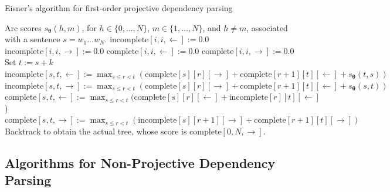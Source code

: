 \begin{algorithm}[h!]
   \caption{Eisner's algorithm for first-order projective dependency parsing\label{alg:eisner}}
\begin{algorithmic}[1]
    Arc scores $s_{\boldsymbol{\theta}}(h,m)$, for $h \in \{0,\ldots,N\}$, 
   $m \in \{1,\ldots,N\}$, and $h \ne m$, associated with a sentence $s=w_1\ldots w_N$.
   \STATE {}
	\STATE {}
	\STATE $\mathrm{incomplete}[i,i,\leftarrow] := 0.0$
	\STATE $\mathrm{incomplete}[i,i,\rightarrow] := 0.0$
	\STATE
	\STATE {}
	\STATE $\mathrm{complete}[i,i,\leftarrow] := 0.0$
	\STATE $\mathrm{complete}[i,i,\rightarrow] := 0.0$
	\ENDFOR
	\STATE
	\STATE {}
	\STATE Set $t := s + k$ 
	\STATE
	\STATE {}
	\STATE $\mathrm{incomplete}[s,t,\leftarrow] := \max_{s \le r < t} (\mathrm{complete}[s][r][\rightarrow] + \mathrm{complete}[r+1][t][\leftarrow] + s_{\boldsymbol{\theta}}(t,s)) $
	\STATE $\mathrm{incomplete}[s,t,\rightarrow] := \max_{s \le r < t} (\mathrm{complete}[s][r][\rightarrow] + \mathrm{complete}[r+1][t][\leftarrow] + s_{\boldsymbol{\theta}}(s,t))$
	\STATE
	\STATE {}
	\STATE $\mathrm{complete}[s,t,\leftarrow] := \max_{s \le r < t} (\mathrm{complete}[s][r][\leftarrow] + \mathrm{incomplete}[r][t][\leftarrow]$)
	\STATE $\mathrm{complete}[s,t,\rightarrow] := \max_{s \le r < t} (\mathrm{incomplete}[s][r+1][\rightarrow] + \mathrm{complete}[r+1][t][\rightarrow])$
	\ENDFOR
	\ENDFOR
	\STATE
	\STATE {}
	\STATE Backtrack to obtain the actual tree, whose score is $\mathrm{complete}[0,N,\rightarrow]$.
\end{algorithmic}
\end{algorithm}


\subsection{Algorithms for Non-Projective Dependency Parsing}

